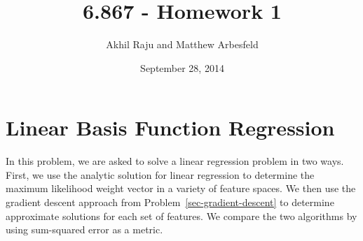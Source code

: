 \documentclass[11pt]{article}   %
\theoremstyle{plain}
\begin{document}
\pagestyle{myheadings}          %
\title{6.867 - Homework 1}           %
\author{Akhil Raju and Matthew Arbesfeld}
\date{September 28, 2014}         %
\maketitle


\section{Linear Basis Function Regression}\label{sec-basis}
In this problem, we are asked to solve a linear regression problem in two ways. First, we use the analytic solution for linear regression to determine the maximum likelihood weight vector in a variety of feature spaces. We then use the gradient descent approach from Problem~\ref{sec-gradient-descent} to determine approximate solutions for each set of features. We compare the two algorithms by using sum-squared error as a metric.
\end{document}

